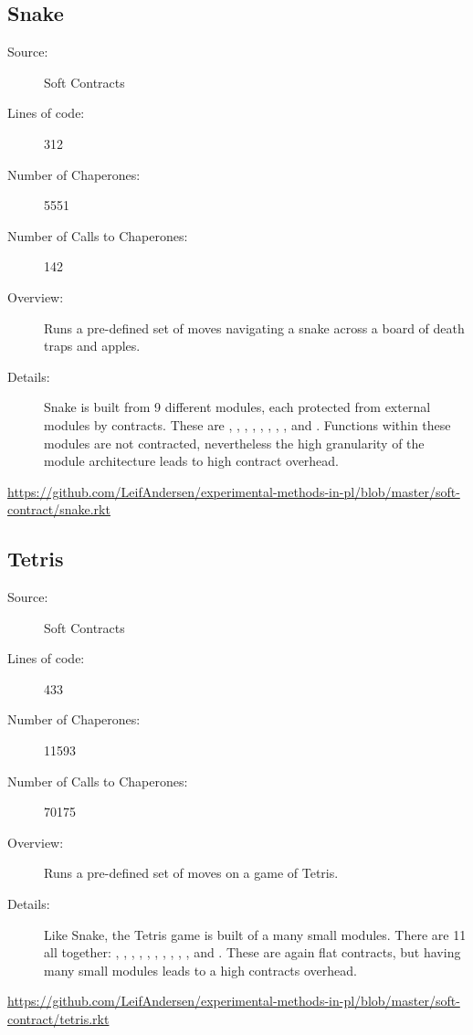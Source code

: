 \subsection*{Snake~\hrulefill}
\begin{description}
\item[Source:] Soft Contracts
\item[Lines of code:] 312
\item[Number of Chaperones:] 5551
\item[Number of Calls to Chaperones:] 142
\item[Overview:]
  Runs a pre-defined set of moves navigating a snake across a board of death traps and apples.
\item[Details:] 
  Snake is built from 9 different modules, each protected from external modules by contracts.
  These are , , , , , , , , and .
  Functions within these modules are not contracted, nevertheless the high granularity of the module architecture leads to high contract overhead.
\end{description}
\url{https://github.com/LeifAndersen/experimental-methods-in-pl/blob/master/soft-contract/snake.rkt}

\subsection*{Tetris~\hrulefill}
\begin{description}
\item[Source:] Soft Contracts
\item[Lines of code:] 433
\item[Number of Chaperones:] 11593
\item[Number of Calls to Chaperones:] 70175
\item[Overview:]
  Runs a pre-defined set of moves on a game of Tetris.
\item[Details:] 
  Like Snake, the Tetris game is built of a many small modules.
  There are 11 all together: , , , , , , , , , , and .
  These are again flat contracts, but having many small modules leads to a high contracts overhead.
\end{description}
\url{https://github.com/LeifAndersen/experimental-methods-in-pl/blob/master/soft-contract/tetris.rkt}


